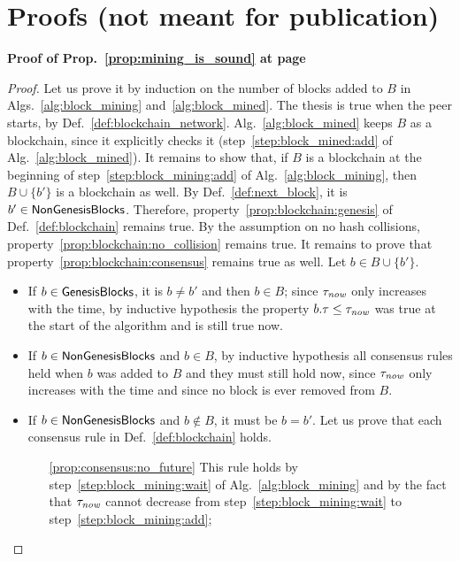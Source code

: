 \newpage

\appendix
\section{Proofs (not meant for publication)}

\textbf{Proof of Prop.~\ref{prop:mining_is_sound} at page~\pageref{prop:mining_is_sound}}

\begin{proof}
  Let us prove it by induction on the number of blocks added to $B$ in Algs.~\ref{alg:block_mining}
  and~\ref{alg:block_mined}. The thesis is true when the peer starts,
  by Def.~\ref{def:blockchain_network}. Alg.~\ref{alg:block_mined} keeps $B$
  as a blockchain, since it explicitly checks it (step~\ref{step:block_mined:add} of
  Alg.~\ref{alg:block_mined}). It remains to show that, if $B$ is a blockchain at the beginning
  of step~\ref{step:block_mining:add} of Alg.~\ref{alg:block_mining}, then $B\cup\{b'\}$ is a
  blockchain as well. By Def.~\ref{def:next_block}, it is $b'\in{\mathsf{NonGenesisBlocks}}$.
  Therefore, property~\ref{prop:blockchain:genesis} of Def.~\ref{def:blockchain} remains true.
  By the assumption on no hash collisions, property~\ref{prop:blockchain:no_collision} remains true.
  It remains to prove that property~\ref{prop:blockchain:consensus} remains true as well.
  Let $b\in B\cup\{b'\}$.
  \begin{itemize}
  \item If $b\in{\mathsf{GenesisBlocks}}$, it is $b\not=b'$ and then $b\in B$; since $\tau_{\mathit{now}}$ only
    increases with the time, by inductive hypothesis
    the property $b.\tau\le\tau_{\mathit{now}}$ was true at the start of the
    algorithm and is still true now.
  \item If $b\in{\mathsf{NonGenesisBlocks}}$ and $b\in B$, by inductive hypothesis
    all consensus rules held when $b$ was added to
    $B$ and they must still hold now, since $\tau_{\mathit{now}}$ only
    increases with the time and since no block is ever removed from $B$.
  \item If $b\in{\mathsf{NonGenesisBlocks}}$ and $b\not\in B$, it must be $b=b'$. Let us prove that each consensus rule
    in Def.~\ref{def:blockchain} holds.
    \begin{itemize}
    \item[\ref{prop:consensus:no_future}] This rule holds by step~\ref{step:block_mining:wait} of
      Alg.~\ref{alg:block_mining} and by the fact
      that $\tau_{\mathit{now}}$ cannot decrease from step~\ref{step:block_mining:wait} to
      step~\ref{step:block_mining:add};

\end{itemize}
\end{itemize}
\end{proof}
